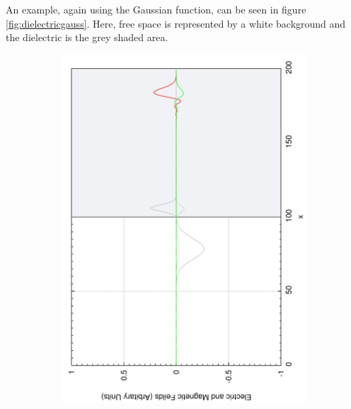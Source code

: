 An example, again using the Gaussian function, can be seen in figure \ref{fig:dielectricgauss}. Here, free space is represented by a white background and the dielectric is the grey shaded area.
\begin{figure}[ht]
        \centering
        \begin{subfigure}[ht]{0.45\textwidth}
                \centering
                \includegraphics[angle=270, width=\textwidth]{dielectricdouble.pdf}
        \end{subfigure}%
        ~
        \begin{subfigure}[ht]{0.45\textwidth}
                \centering

\end{subfigure}
\end{figure}
